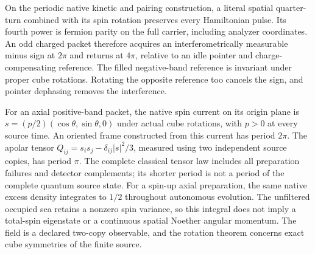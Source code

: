 On the periodic native kinetic and pairing construction, a literal spatial
quarter-turn combined with its spin rotation preserves every Hamiltonian
pulse. Its fourth power is fermion parity on the full carrier, including
analyzer coordinates. An odd charged packet therefore acquires an
interferometrically measurable minus sign at $2\pi$ and returns at $4\pi$,
relative to an idle pointer and charge-compensating reference. The filled
negative-band reference is invariant under proper cube rotations. Rotating
the opposite reference too cancels the sign, and pointer dephasing removes
the interference.

For an axial positive-band packet, the native spin current on its origin
plane is $s=(p/2)(\cos\theta,\sin\theta,0)$ under actual cube rotations,
with $p>0$ at every source time. An oriented frame constructed from this
current has period $2\pi$. The apolar tensor
$Q_{ij}=s_i s_j-\delta_{ij}|s|^2/3$, measured using two independent source
copies, has period $\pi$. The complete classical tensor law includes all
preparation failures and detector complements; its shorter period is not a
period of the complete quantum source state. For a spin-up axial preparation,
the same native excess density integrates to $1/2$ throughout autonomous
evolution. The unfiltered occupied sea retains a nonzero spin variance,
so this integral does not imply a total-spin eigenstate or a continuous
spatial Noether angular momentum. The field is a declared two-copy observable,
and the rotation theorem concerns exact cube symmetries of the finite source.
